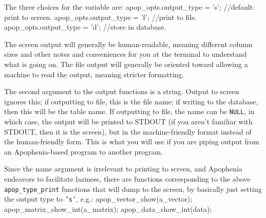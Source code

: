 The three choices for the  
variable are:
apop_opts.output_type   = 's';  //default: print to screen.
apop_opts.output_type   = 'f';  //print to file.
apop_opts.output_type   = 'd';  //store in database.

The screen output will generally be human-readable, meaning different
column sizes and other notes and conveniences for you at the terminal to
understand what is going on.
The file output will generally be oriented toward allowing a machine to
read the output, meaning stricter formatting. 

The second argument to the output functions is a string.  Output to
screen ignores this; if outputting to file, this is the file name;
if writing to the database, then this will be the table name.
If outputting to file, the name can be {\tt NULL}, in which case, the
output will be printed to STDOUT (if you aren't familiar with STDOUT,
then it is the screen), but in the machine-friendly format instead of
the human-friendly form. This is what you will use if you are piping
output from an Apophenia-based program to another program.

Since the name argument is irrelevant to printing to screen, and
Apophenia endeavors to facilitate laziness, there are functions
corresponding to the above {\tt apop\_type\_print} functions that will
dump to the screen, by basically just setting the output type to {\tt 's'}, e.g.:
 
 
 
apop_vector_show(a_vector);
apop_matrix_show_int(a_matrix);
apop_data_show_int(data);

